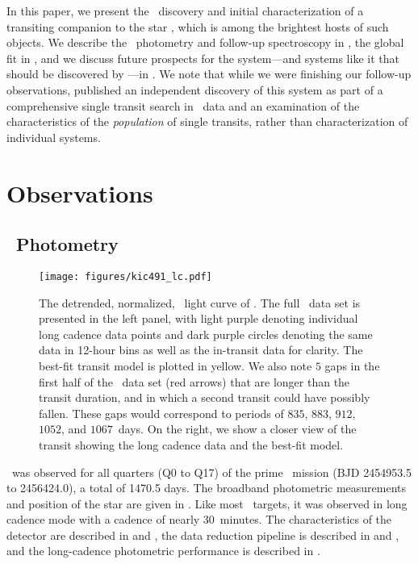 \documentclass[twocolumn]{aastex63}
\begin{document}
In this paper, we present the \kep\ discovery and initial characterization of a transiting companion to the star \thisstar, which is among the brightest hosts of such objects. We describe the \kep\ photometry and follow-up spectroscopy in , the global fit in , and we discuss future prospects for the system---and systems like it that should be discovered by \tess---in . We note that while we were finishing our follow-up observations, \citet{kawahara:2019} published an independent discovery of this system as part of a comprehensive single transit search in \kep\ data and an examination of the characteristics of the \textit{population} of single transits, rather than characterization of individual systems.

\section{Observations}
\label{sec:data}

\subsection{\kep\ Photometry}



\begin{figure*}[!htb]
    \centering
    \texttt{[image: figures/kic491\_lc.pdf]}
    \caption{The detrended, normalized, \kep\ light curve of \thisstar. The full \kep\ data set is presented in the left panel, with light purple denoting individual long cadence data points and dark purple circles denoting the same data in 12-hour bins as well as the in-transit data for clarity. The best-fit transit model is plotted in yellow. We also note $5$ gaps in the first half of the \kep\ data set (red arrows) that are longer than the transit duration, and in which a second transit could have possibly fallen. These gaps would correspond to periods of $835$, $883$, $912$, $1052$, and $1067$\ days. On the right, we show a closer view of the transit showing the long cadence data and the best-fit model.}
    \label{fig:lc}
\end{figure*}

\thisstar\ was observed for all quarters (Q0 to Q17) of the prime \kep\ mission (BJD 2454953.5 to 2456424.0), a total of 1470.5 days. The broadband photometric measurements and position of the star are given in . Like most \kep\ targets, it was observed in long cadence mode with a cadence of nearly $30$\ minutes. The characteristics of the detector are described in \citet{koch:2010} and \citet{vancleve:2016}, the data reduction pipeline is described in \citet{jenkins:2010a} and \citet{jenkins:2017}, and the long-cadence photometric performance is described in \citet{jenkins:2010b}. 
\end{document}
